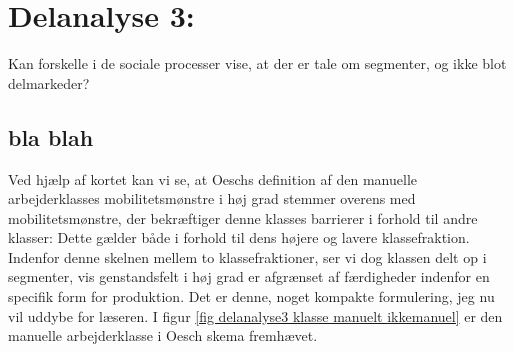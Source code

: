 






\chapter{Delanalyse 3:  \label{kapitel_delanalyse3_klasser}}



\begin{tcolorbox}[title=Forskningspørgsmål 2,
subtitle style={boxrule=0.4pt} ]
  Kan forskelle i de sociale processer vise, at der er tale om segmenter, og ikke blot delmarkeder?
\end{tcolorbox}



\section{bla blah}
 
Ved hjælp af kortet kan vi se, at Oeschs definition af den manuelle arbejderklasses mobilitetsmønstre i høj grad stemmer overens med mobilitetsmønstre, der bekræftiger denne klasses barrierer i forhold til andre klasser: Dette gælder både i forhold til dens højere og lavere klassefraktion. Indenfor denne skelnen mellem to klassefraktioner, ser vi dog klassen delt op i segmenter, vis genstandsfelt i høj grad er afgrænset af færdigheder indenfor en specifik form for produktion. Det er denne, noget kompakte formulering, jeg nu vil uddybe for læseren. I figur \ref{fig delanalyse3 klasse manuelt ikkemanuel} er den manuelle arbejderklasse i Oesch skema fremhævet. 


